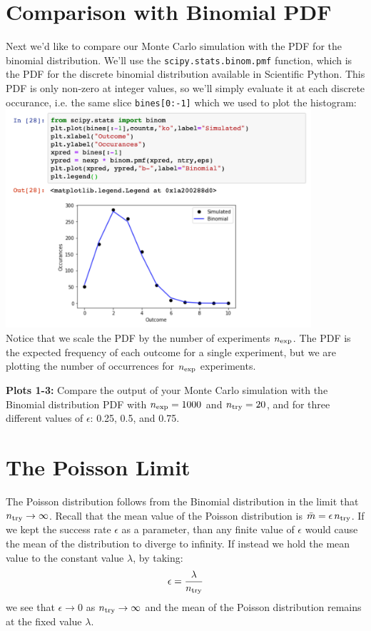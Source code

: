 \pagebreak

\section{Comparison with Binomial PDF}

Next we'd like to compare our Monte Carlo simulation with the PDF for
the binomial distribution.  We'll use the {\tt scipy.stats.binom.pmf}
function, which is the PDF for the discrete binomial distribution
available in Scientific Python.  This PDF is only non-zero at integer
values, so we'll simply evaluate it at each discrete occurance,
i.e. the same slice {\tt bines[0:-1]} which we used to plot the
histogram:\\
\includegraphics[width=0.85\textwidth]{figs/labs/distributions/compare.png}
\\ Notice that we scale the PDF by the number of experiments $n_{\rm
  exp}$.  The PDF is the expected frequency of each outcome for a
single experiment, but we are plotting the number of occurrences for
$n_{\rm exp}$ experiments.

{\bf Plots 1-3:}  Compare the output of your Monte Carlo simulation with the Binomial
distribution PDF with $n_{\rm exp} = 1000$ and $n_{\rm try} = 20$, and
for three different values of $\epsilon$: 0.25, 0.5, and 0.75.  


\section{The Poisson Limit}

The Poisson distribution follows from the Binomial distribution in the
limit that $n_{\rm try} \to \infty$.  Recall that the mean value of
the Poisson distribution is $\bar{m} = \epsilon \, n_{\rm try}$.  If
we kept the success rate $\epsilon$ as a parameter, than any finite
value of $\epsilon$ would cause the mean of the distribution to diverge to infinity.
If instead we hold the mean value to the constant value $\lambda$, by taking:
\begin{displaymath}
\epsilon = \frac{\lambda}{n_{\rm try}}
\end{displaymath}
we see that $\epsilon \to 0$ as $n_{\rm try} \to \infty$ and the mean
of the Poisson distribution remains at the fixed value $\lambda$.

